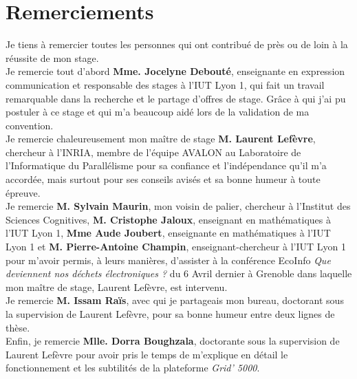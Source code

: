 \newpage
\thispagestyle{empty}
\section*{Remerciements}
Je tiens à remercier toutes les personnes qui ont contribué de près ou de loin à la réussite de mon stage. \\

Je remercie tout d'abord \textbf{Mme. Jocelyne Debouté}, enseignante en expression communication et responsable des stages à l'IUT Lyon 1, qui fait un travail remarquable dans la recherche et le partage d'offres de stage. Grâce à qui j'ai pu postuler à ce stage et qui m'a beaucoup aidé lors de la validation de ma convention. \\

Je remercie chaleureusement mon maître de stage \textbf{M. Laurent Lefèvre}, chercheur à l'INRIA, membre de l'équipe AVALON au Laboratoire de l'Informatique du Parallélisme pour sa confiance et l'indépendance qu'il m'a accordée, mais surtout pour ses conseils avisés et sa bonne humeur à toute épreuve.\\ 

Je remercie \textbf{M. Sylvain Maurin}, mon voisin de palier, chercheur à l'Institut des Sciences Cognitives, \textbf{M. Cristophe Jaloux}, enseignant en mathématiques à l'IUT Lyon 1, \textbf{Mme Aude Joubert}, enseignante en mathématiques à l'IUT Lyon 1 et \textbf{M. Pierre-Antoine Champin}, enseignant-chercheur à l'IUT Lyon 1 pour m'avoir permis, à leurs manières, d'assister à la conférence EcoInfo \emph{Que deviennent nos déchets électroniques ?} du 6 Avril dernier à Grenoble dans laquelle mon maître de stage, Laurent Lefèvre, est intervenu.\\

Je remercie \textbf{M. Issam Raïs}, avec qui je partageais mon bureau, doctorant sous la supervision de Laurent Lefèvre, pour sa bonne humeur entre deux lignes de thèse.\\

Enfin, je remercie \textbf{Mlle. Dorra Boughzala}, doctorante sous la supervision de Laurent Lefèvre pour avoir pris le temps de m'explique en détail le fonctionnement et les subtilités de la plateforme \emph{Grid' 5000}.
